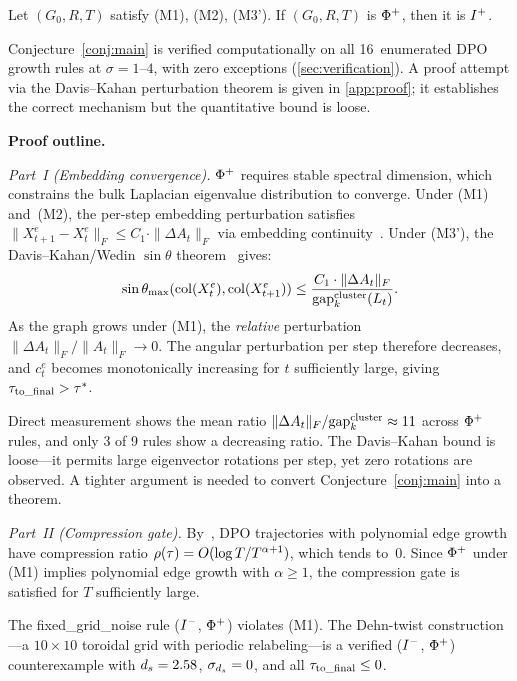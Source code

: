 \documentclass{../shared/primo}
\begin{document}
\begin{conjecture}\label{conj:main}
Let $(G_0, R, T)$ satisfy \textup{(M1)}, \textup{(M2)}, \textup{(M3')}. If $(G_0, R, T)$ is $\Phi\textsuperscript{+}$, then it is $I\textsuperscript{+}$.
\end{conjecture}

Conjecture~\ref{conj:main} is verified computationally on all 16~enumerated DPO growth rules at $\sigma = 1\text{--}4$, with zero exceptions (\cref{sec:verification}). A proof attempt via the Davis--Kahan perturbation theorem is given in \cref{app:proof}; it establishes the correct mechanism but the quantitative bound is loose.

\textbf{Proof outline.}

\emph{Part~I (Embedding convergence).} $\Phi\textsuperscript{+}$ requires stable spectral dimension, which constrains the bulk Laplacian eigenvalue distribution to converge. Under (M1) and~(M2), the per-step embedding perturbation satisfies $\|X_{t+1}^e - X_t^e\|_F \leq C_1 \cdot \|\Delta A_t\|_F$ via embedding continuity~\cite{kowalczyk2026bayesian}. Under (M3'), the Davis--Kahan/Wedin $\sin\theta$ theorem~\cite{davis1970rotation,wedin1972perturbation} gives:
\[
\sin\theta_{\max}(\operatorname{col}(X_t^e), \operatorname{col}(X_{t+1}^e)) \leq \frac{C_1 \cdot \|\Delta A_t\|_F}{\mathrm{gap}_k^{\mathrm{cluster}}(L_t)}.
\]
As the graph grows under (M1), the \emph{relative} perturbation $\|\Delta A_t\|_F / \|A_t\|_F \to 0$. The angular perturbation per step therefore decreases, and $c_t^e$ becomes monotonically increasing for $t$ sufficiently large, giving $\tau_{\mathrm{to\_final}} > \tau^*$.

\begin{remark}
Direct measurement shows the mean ratio $\|\Delta A_t\|_F / \mathrm{gap}_k^{\mathrm{cluster}} \approx 11$ across $\Phi\textsuperscript{+}$ rules, and only 3 of 9 rules show a decreasing ratio. The Davis--Kahan bound is loose---it permits large eigenvector rotations per step, yet zero rotations are observed. A tighter argument is needed to convert Conjecture~\ref{conj:main} into a theorem.
\end{remark}

\emph{Part~II (Compression gate).} By~\cite[Proposition~3]{kowalczyk2026predicates}, DPO trajectories with polynomial edge growth have compression ratio $\rho(\tau) = O(\log T / T^{\alpha+1})$, which tends to~0. Since $\Phi\textsuperscript{+}$ under (M1) implies polynomial edge growth with $\alpha \geq 1$, the compression gate is satisfied for $T$ sufficiently large.

\begin{remark}
The fixed\_grid\_noise rule ($I\textsuperscript{$-$}$, $\Phi\textsuperscript{+}$) violates (M1). The Dehn-twist construction---a $10 \times 10$ toroidal grid with periodic relabeling---is a verified ($I\textsuperscript{$-$}$, $\Phi\textsuperscript{+}$) counterexample with $d_s = 2.58$, $\sigma_{d_s} = 0$, and all $\tau_{\mathrm{to\_final}} \leq 0$.
\end{remark}
\end{document}
